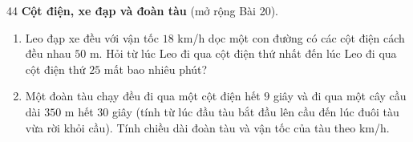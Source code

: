 \begin{probbox}{44}{}
\textbf{Cột điện, xe đạp và đoàn tàu} (mở rộng Bài 20).
\begin{enumerate}[label=\alph*),leftmargin=1.6em,itemsep=1pt]
\item Leo đạp xe đều với vận tốc $18$ km/h dọc một con đường có các cột điện cách đều nhau $50$ m. Hỏi từ lúc Leo đi qua cột điện thứ nhất đến lúc Leo đi qua cột điện thứ $25$ mất bao nhiêu phút?
\item Một đoàn tàu chạy đều đi qua một cột điện hết $9$ giây và đi qua một cây cầu dài $350$ m hết $30$ giây (tính từ lúc đầu tàu bắt đầu lên cầu đến lúc đuôi tàu vừa rời khỏi cầu). Tính chiều dài đoàn tàu và vận tốc của tàu theo km/h.
\end{enumerate}
\end{probbox}
